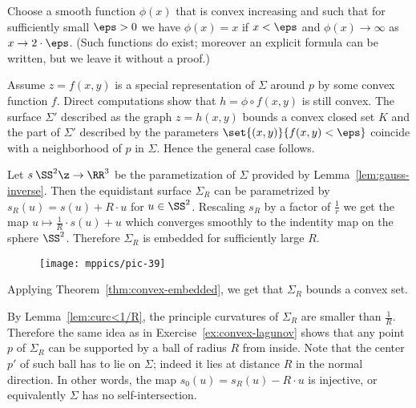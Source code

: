 Choose a smooth function $\phi(x)$ that is convex increasing and such that for sufficiently small $\eps>0$ we have $\phi(x)=x$ if $x<\eps$ and $\phi(x)\to\infty$ as $x\to 2\cdot\eps$.
(Such functions do exist; moreover an explicit formula can be written, but we leave it without a proof.)

Assume $z=f(x,y)$ is a special representation of $\Sigma$ around $p$ by some convex function $f$.
Direct computations show that $h=\phi\circ f(x,y)$ is still convex.
The surface $\Sigma'$ described as the graph $z=h(x,y)$ bounds a convex closed set $K$ and the part of $\Sigma'$ described by 
the parameters $\set{(x,y)}{f(x,y)<\eps}$ coincide with a neighborhood of $p$ in $\Sigma$.
Hence the general case follows.\qeds

Let $s\:\SS^2\z\to\RR^3$ be the parametization of $\Sigma$ provided by Lemma~\ref{lem:gauss-inverse}.
Then the equidistant surface $\Sigma_R$ can be parametrized by $s_R(u)= s(u)+R\cdot u$ for $u\in\SS^2$.
Rescaling $s_R$ by a  factor of $\tfrac1r$ we get the map $u\mapsto \tfrac1R\cdot s(u)+u$ which converges smoothly to the indentity map on the sphere $\SS^2$.
Therefore $\Sigma_R$ is embedded for sufficiently large $R$.

\begin{wrapfigure}{o}{47 mm}
\vskip-0mm
\centering
\texttt{[image: mppics/pic-39]}
\vskip-0mm
\end{wrapfigure}

Applying Theorem~\ref{thm:convex-embedded}, we get that $\Sigma_R$ bounds a convex set.

By Lemma~\ref{lem:curc<1/R}, the principle curvatures of $\Sigma_R$ are smaller than $\tfrac1R$.
Therefore the same idea as in Exercise~\ref{ex:convex-lagunov} shows that any point $p$ of $\Sigma_R$ can be supported by a ball of radius $R$ from inside.
Note that the center $p'$ of such ball has to lie on $\Sigma$;
indeed it lies at distance $R$ in the normal direction.
In other words, the map $s_0(u)=s_R(u)-R\cdot u$ is injective, or equivalently $\Sigma$  has no self-intersection.
\qeds





















